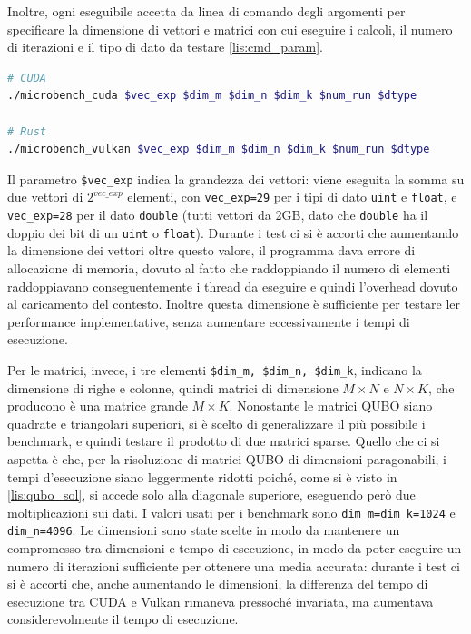 Inoltre, ogni eseguibile accetta da linea di comando degli argomenti per specificare la dimensione di vettori e matrici con cui eseguire i calcoli, il numero di iterazioni e il tipo di dato da testare \ref{lis:cmd_param}.

\vspace{5mm}
\begin{lstlisting}[language=bash, caption=Esecuzione benchmark, label=lis:cmd_param]
# CUDA
./microbench_cuda $vec_exp $dim_m $dim_n $dim_k $num_run $dtype

# Rust
./microbench_vulkan $vec_exp $dim_m $dim_n $dim_k $num_run $dtype
\end{lstlisting}
\vspace{5mm}

Il parametro \verb|$vec_exp| indica la grandezza dei vettori: viene eseguita la somma su due vettori di $2^{vec\_exp}$ elementi, con \verb|vec_exp=29| per i tipi di dato \verb|uint| e \verb|float|, e \verb|vec_exp=28| per il dato \verb|double| (tutti vettori da 2GB, dato che \verb|double| ha il doppio dei bit di un \verb|uint| o \verb|float|). Durante i test ci si è accorti che aumentando la dimensione dei vettori oltre questo valore, il programma dava errore di allocazione di memoria, dovuto al fatto che raddoppiando il numero di elementi raddoppiavano conseguentemente i thread da eseguire e quindi l'overhead dovuto al caricamento del contesto. Inoltre questa dimensione è sufficiente per testare ler performance implementative, senza aumentare eccessivamente i tempi di esecuzione.

Per le matrici, invece, i tre elementi \verb|$dim_m, $dim_n, $dim_k|, indicano la dimensione di righe e colonne, quindi matrici di dimensione $M \times N$ e $N \times K$, che producono è una matrice grande $M \times K$. Nonostante le matrici \gls{QUBO} siano quadrate e triangolari superiori, si è scelto di generalizzare il più possibile i benchmark, e quindi testare il prodotto di due matrici sparse. Quello che ci si aspetta è che, per la risoluzione di matrici \gls{QUBO} di dimensioni paragonabili, i tempi d'esecuzione siano leggermente ridotti poiché, come si è visto in \ref{lis:qubo_sol}, si accede solo alla diagonale superiore, eseguendo però due moltiplicazioni sui dati. I valori usati per i benchmark sono \verb|dim_m=dim_k=1024| e \verb|dim_n=4096|. Le dimensioni sono state scelte in modo da mantenere un compromesso tra dimensioni e tempo di esecuzione, in modo da poter eseguire un numero di iterazioni sufficiente per ottenere una media accurata: durante i test ci si è accorti che, anche aumentando le dimensioni, la differenza del tempo di esecuzione tra \gls{CUDA} e Vulkan rimaneva pressoché invariata, ma aumentava considerevolmente il tempo di esecuzione.

